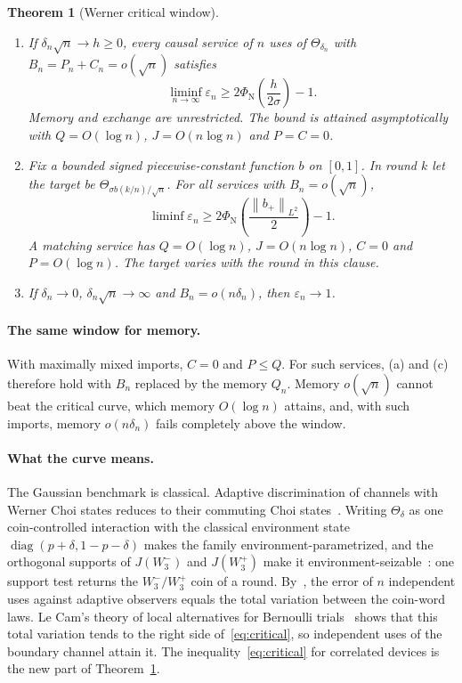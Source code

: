 \documentclass[11pt]{article}
\newtheorem{theorem}{Theorem}
\theoremstyle{definition}
\theoremstyle{remark}
\newcommand{\norm}[1]{\left\lVert#1\right\rVert}
\newcommand{\Ncdf}{\Phi_{\mathrm N}}
\newcommand{\Wminus}{W_3^-}
\newcommand{\Wplus}{W_3^+}
\newcommand{\eps}{\varepsilon}
\begin{document}
\begin{theorem}[Werner critical window]\label{thm:edge}
\begin{enumerate}[label=(\alph*),itemsep=4pt]
\item If $\delta_n\sqrt n\to h\ge0$, every causal service of $n$ uses of $\Theta_{\delta_n}$ with $B_n=P_n+C_n=o(\sqrt n)$ satisfies
\begin{equation}\label{eq:critical}
 \liminf_{n\to\infty}\eps_n\ge2\Ncdf\left(\frac{h}{2\sigma}\right)-1.
\end{equation}
Memory and exchange are unrestricted. The bound is attained asymptotically with $Q=O(\log n)$, $J=O(n\log n)$ and $P=C=0$.
\item Fix a bounded signed piecewise-constant function $b$ on $[0,1]$. In round $k$ let the target be $\Theta_{\sigma b(k/n)/\sqrt n}$. For all services with $B_n=o(\sqrt n)$,
\begin{equation}\label{eq:waveform}
 \liminf\eps_n\ge2\Ncdf\left(\frac{\norm{b_+}_{L^2}}2\right)-1.
\end{equation}
A matching service has $Q=O(\log n)$, $J=O(n\log n)$, $C=0$ and $P=O(\log n)$. The target varies with the round in this clause.
\item If $\delta_n\to0$, $\delta_n\sqrt n\to\infty$ and $B_n=o(n\delta_n)$, then $\eps_n\to1$.
\end{enumerate}
\end{theorem}

\paragraph{The same window for memory.}
With maximally mixed imports, $C=0$ and $P\le Q$. For such services, (a) and (c) therefore hold with $B_n$ replaced by the memory $Q_n$. Memory $o(\sqrt n)$ cannot beat the critical curve, which memory $O(\log n)$ attains, and, with such imports, memory $o(n\delta_n)$ fails completely above the window.

\paragraph{What the curve means.}
The Gaussian benchmark is classical. Adaptive discrimination of channels with Werner Choi states reduces to their commuting Choi states~\cite[Section~IV]{CopePirandola}. Writing $\Theta_\delta$ as one coin-controlled interaction with the classical environment state $\operatorname{diag}(p+\delta,1-p-\delta)$ makes the family environment-parametrized, and the orthogonal supports of $J(\Wminus)$ and $J(\Wplus)$ make it environment-seizable~\cite[Definition~36]{WildeEtAl}: one support test returns the $\Wminus/\Wplus$ coin of a round. By~\cite[Proposition~35 and Theorem~37]{WildeEtAl}, the error of $n$ independent uses against adaptive observers equals the total variation between the coin-word laws. Le Cam's theory of local alternatives for Bernoulli trials~\cite[Chapters~7 and~15]{vanderVaart} shows that this total variation tends to the right side of~\eqref{eq:critical}, so independent uses of the boundary channel attain it. The inequality~\eqref{eq:critical} for correlated devices is the new part of Theorem~\ref{thm:edge}.
\end{document}

